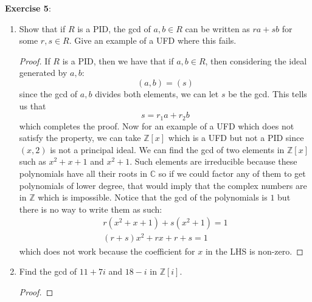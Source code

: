\documentclass{article}
\begin{document}
\textbf{Exercise 5}: 
\begin{enumerate}
	\item Show that if $R$ is a PID, the gcd of $a, b \in R$ can be written as $ra + sb$ for some $r, s\in R$. Give an example of a UFD where this fails.
		\begin{proof}
			If $R$ is a PID, then we have that if $a, b \in R$, then considering the ideal generated by $a, b$:
			\begin{equation*}
				(a, b) = (s)
			\end{equation*}
			since the gcd of $a, b$ divides both elements, we can let $s$ be the gcd. This tells us that 
			\begin{equation*}
				s = r_{1}a + r_{2}b
			\end{equation*}
			which completes the proof. Now for an example of a UFD which does not satisfy the property, we can take $\mathbb{Z}[x]$ which is a UFD but not a PID since $(x, 2)$ is not a principal ideal. We can find the gcd of two elements in $\mathbb{Z}[x]$ such as $x^{2} + x + 1$ and $x^{2} + 1$. Such elements are irreducible because these polynomials have all their roots in $\mathbb{C}$ so if we could factor any of them to get polynomials of lower degree, that would imply that the complex numbers are in $\mathbb{Z}$ which is impossible. Notice that the gcd of the polynomials is $1$ but there is no way to write them as such:
			\begin{align*}
				r(x^{2} + x + 1) + s(x^{2} + 1) = 1 \\
				(r + s)x^{2} + rx + r + s = 1
			\end{align*}
			which does not work because the coefficient for $x$ in the LHS is non-zero.
		\end{proof}
	\item Find the gcd of $11 + 7i$ and $18 - i$ in $\mathbb{Z}[i]$.
		\begin{proof}


\end{proof}
\end{enumerate}
\end{document}
